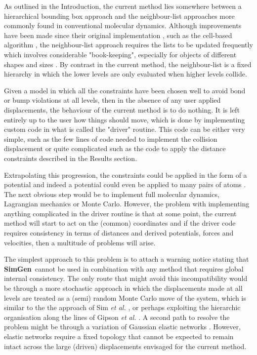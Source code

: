 \documentclass[review]{elsarticle}
\newcommand{\TT}[1]{{\ttfamily\bfseries #1}}
\newcommand{\NAME}{{\TT{SimGen}}}
\begin{document}
{{{{{As outlined in the Introduction, the current method lies somewhere between a
hierarchical bounding box approach \cite{TeschnerMet05} and the neighbour-list
approaches more commonly found in conventional molecular dynamics.   Although improvements
have been made since their original implementation \cite{VerletL67}, such as the cell-based
algorithm \cite{YaoZet04},  the neighbour-list approach requires the lists to be updated frequently
which involves considerable "book-keeping", especially for objects of different shapes
and sizes \cite{DonevAet05,MuthBet07}.   By contrast in the current method, the 
neighbour-list is a fixed hierarchy in which the lower levels are only evaluated
when higher levels collide. 

Given a model in which all the constraints have been chosen well to avoid bond
or bump violations at all levels, then in the absence of any user applied displacements,
the behaviour of the current method is to do nothing.
It is left entirely up to the user how things should move, which is done by implementing
custom code in what is called the "driver" routine.    This code can be either very
simple, such as the few lines of code needed to implement the collision displacement or
quite complicated such as the code to apply the distance constraints described in the
Results section.

Extrapolating this progression, the constraints could be applied in the form of a potential and
indeed a potential could even be applied to many pairs of atoms \cite{PerioleXet09}.   The next
obvious step would be to implement full molecular dynamics, Lagrangian mechanics or Monte Carlo.
However, the problem with implementing anything complicated in the driver routine is that at some
point, the current method will start to act on the (common) coordinates and if the
driver code requires consistency in terms of distances and derived potentials, forces and
velocities, then a multitude of problems will arise.

The simplest approach to this problem is to attach a warning notice stating that \NAME\ cannot
be used in combination with any method that requires global internal consistency.   The only
route that might avoid this incompatibility would be through a more stochastic approach
in which the displacements made at all levels are treated as a (semi) random Monte Carlo
move of the system, which is similar to the the approach of Sim {\em et al.} \cite{SimAYLet12b},
or perhaps exploiting the hierarchic organisation along the lines of Gipson {\em et al.} \cite{GipsonBet13}.
A second path to resolve the problem might be through a variation of Gaussian elastic
networks \cite{ZhangZet09}.  However, elastic
networks require a fixed topology that cannot be expected to remain intact across the
large (driven) displacements envisaged for the current method.

}}}}}
\end{document}
